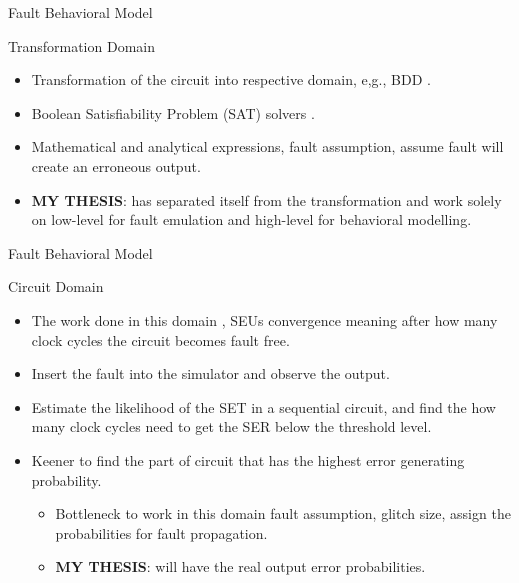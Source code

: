 \documentclass[aspectratio=1610]{beamer}
\begin{document}
\begin{frame}{Fault Behavioral Model}

\begin{block}{Transformation Domain}
\end{block}
\begin{itemize}


\item Transformation of the circuit into respective domain, e,g., BDD \citep{ubar2014modeling}.



\item Boolean Satisfiability Problem (SAT) solvers \citep{shazli2011high}.

\item Mathematical and analytical expressions, fault assumption, assume fault will create an erroneous output.
\end{itemize}
\begin{itemize}
\item \textbf{MY THESIS}: has separated itself from the transformation and work solely on low-level for fault emulation and high-level for behavioral modelling.
\end{itemize} 






\end{frame}




\begin{frame}{Fault Behavioral Model}

\begin{block}{Circuit Domain}

\end{block}
\begin{itemize}
\item The work done in this domain \citep{miskov2007soft}, \citep{miskov2006mars}
 SEUs convergence meaning after how many clock cycles the circuit becomes fault free.
\item Insert the fault into the simulator and observe the output. 


\item Estimate the likelihood of the SET in a sequential circuit, and find the how many clock cycles need to get the SER below the threshold level.
\item Keener to find the part of circuit that has the highest error generating probability.

\begin{itemize}

\item Bottleneck to work in this domain fault assumption, glitch size, assign the probabilities for fault propagation.

\item \textbf{MY THESIS}: will have the real output error probabilities.
\end{itemize}

\end{itemize}






\end{frame}
\end{document}
